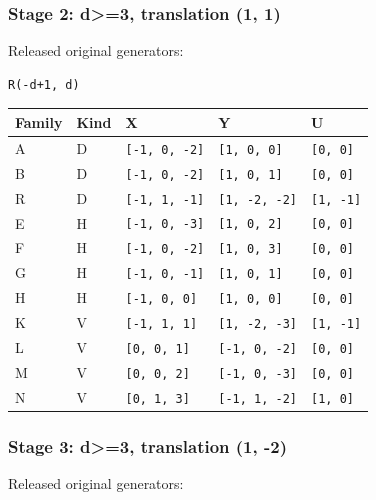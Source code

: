 \documentclass[
  10pt,
]{scrreprt}
\begin{document}
\subsubsection{Stage 2: d\textgreater=3, translation (1,
1)}\label{edition-7-section-15}

Released original generators:

\begin{verbatim}
R(-d+1, d)
\end{verbatim}

\begin{longtable}[]{@{}lllll@{}}
\toprule\noalign{}
Family & Kind & X & Y & U \\
\midrule\noalign{}
\endhead
\bottomrule\noalign{}
\endlastfoot
A & D & \texttt{{[}-1,\ 0,\ -2{]}} & \texttt{{[}1,\ 0,\ 0{]}} &
\texttt{{[}0,\ 0{]}} \\
B & D & \texttt{{[}-1,\ 0,\ -2{]}} & \texttt{{[}1,\ 0,\ 1{]}} &
\texttt{{[}0,\ 0{]}} \\
R & D & \texttt{{[}-1,\ 1,\ -1{]}} & \texttt{{[}1,\ -2,\ -2{]}} &
\texttt{{[}1,\ -1{]}} \\
E & H & \texttt{{[}-1,\ 0,\ -3{]}} & \texttt{{[}1,\ 0,\ 2{]}} &
\texttt{{[}0,\ 0{]}} \\
F & H & \texttt{{[}-1,\ 0,\ -2{]}} & \texttt{{[}1,\ 0,\ 3{]}} &
\texttt{{[}0,\ 0{]}} \\
G & H & \texttt{{[}-1,\ 0,\ -1{]}} & \texttt{{[}1,\ 0,\ 1{]}} &
\texttt{{[}0,\ 0{]}} \\
H & H & \texttt{{[}-1,\ 0,\ 0{]}} & \texttt{{[}1,\ 0,\ 0{]}} &
\texttt{{[}0,\ 0{]}} \\
K & V & \texttt{{[}-1,\ 1,\ 1{]}} & \texttt{{[}1,\ -2,\ -3{]}} &
\texttt{{[}1,\ -1{]}} \\
L & V & \texttt{{[}0,\ 0,\ 1{]}} & \texttt{{[}-1,\ 0,\ -2{]}} &
\texttt{{[}0,\ 0{]}} \\
M & V & \texttt{{[}0,\ 0,\ 2{]}} & \texttt{{[}-1,\ 0,\ -3{]}} &
\texttt{{[}0,\ 0{]}} \\
N & V & \texttt{{[}0,\ 1,\ 3{]}} & \texttt{{[}-1,\ 1,\ -2{]}} &
\texttt{{[}1,\ 0{]}} \\
\end{longtable}

\subsubsection{Stage 3: d\textgreater=3, translation (1,
-2)}\label{edition-7-section-16}

Released original generators:
\end{document}
